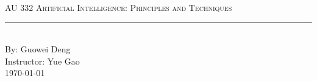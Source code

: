 \documentclass[aps,letterpaper,10pt]{revtex4}
\newcommand{\labtitle}{AU 332 Artificial Intelligence: Principles and Techniques}
\newcommand{\authorname}{Guowei Deng}
\newcommand{\professor}{Yue Gao}
\begin{document}
\begin{titlepage}
\begin{center}
{\Large \textsc{\labtitle} \\ \vspace{4pt}}
\rule[13pt]{\textwidth}{1pt} \\ \vspace{150pt}
{\large By: \authorname \\ \vspace{10pt}
Instructor: \professor \\ \vspace{10pt}
\today}
\end{center}
\end{titlepage}
\end{document}
